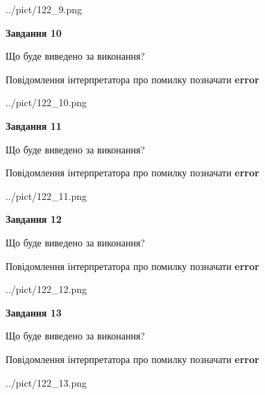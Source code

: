 \documentclass[11pt, ukrainian]{article}
\begin{document}
{\begin {large}
\begin{center}
	{../pict/122_9.png}
\end{center}
\newpage

{\begin {center}\textbf{Завдання 10}\end {center}}\par
Що буде виведено за виконання? \par
Повідомлення інтерпретатора про помилку позначати \textbf{error}

\begin{center}
	{../pict/122_10.png}
\end{center}
\newpage

{\begin {center}\textbf{Завдання 11}\end {center}}\par
Що буде виведено за виконання? \par
Повідомлення інтерпретатора про помилку позначати \textbf{error}

\begin{center}
	{../pict/122_11.png}
\end{center}
\newpage

{\begin {center}\textbf{Завдання 12}\end {center}}\par
Що буде виведено за виконання? \par
Повідомлення інтерпретатора про помилку позначати \textbf{error}

\begin{center}
	{../pict/122_12.png}
\end{center}
\newpage

{\begin {center}\textbf{Завдання 13}\end {center}}\par
Що буде виведено за виконання? \par
Повідомлення інтерпретатора про помилку позначати \textbf{error}

\begin{center}
	{../pict/122_13.png}
\end{center}
\newpage


\end{large}}
\end{document}
